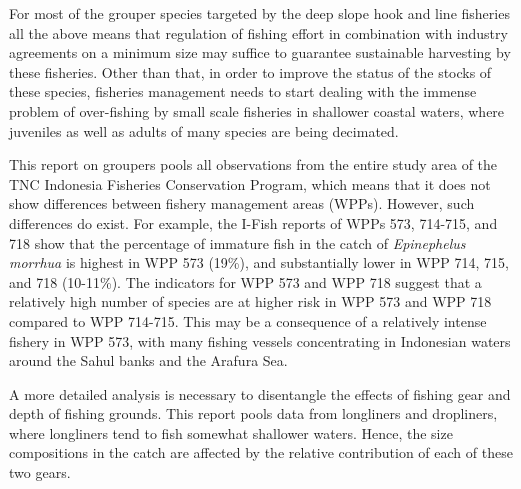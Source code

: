 For most of the grouper species targeted by the deep slope hook and line fisheries all the above means that regulation of fishing effort in combination with industry agreements on a minimum size may suffice to guarantee sustainable harvesting by these fisheries. Other than that, in order to improve the status of the stocks of these species, fisheries management needs to start dealing with the immense problem of over-fishing by small scale fisheries in shallower coastal waters, where juveniles as well as adults of many species are being decimated.

This report on groupers pools all observations from the entire study area of the TNC Indonesia Fisheries Conservation Program, which means that it does not show differences between fishery management areas (WPPs). However, such differences do exist. For example, the I-Fish reports of WPPs 573, 714-715, and 718 show that the percentage of immature fish in the catch of \textit{Epinephelus morrhua} is highest in WPP 573 (19\%), and substantially lower in WPP 714, 715, and 718 (10-11\%). The indicators for WPP 573 and WPP 718 suggest that a relatively high number of species are at higher risk in WPP 573 and WPP 718 compared to WPP 714-715. This may be a consequence of a relatively intense fishery in WPP 573, with many fishing vessels concentrating in Indonesian waters around the Sahul banks and the Arafura Sea.

A more detailed analysis is necessary to disentangle the effects of fishing gear and depth of fishing grounds. This report pools data from longliners and dropliners, where longliners tend to fish somewhat shallower waters. Hence, the size compositions in the catch are affected by the relative contribution of each of these two gears.
